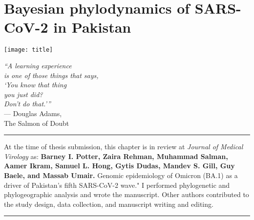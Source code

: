 \chapter{Bayesian phylodynamics of SARS-CoV-2 in Pakistan}\label{ch:chapter2}

\begin{minipage}[b]{0.6\textwidth}
    \texttt{[image: title]} %
  \end{minipage}
  \hfill
  \begin{minipage}[b]{0.32\textwidth}
    \footnotesize
    \begin{flushright}
      \textit{``A learning experience\\is one of those things that says,\\`You know that thing\\you just did?\\Don't do that.'\thinspace''} \\
      --- Douglas Adams, \\The Salmon of Doubt
    \end{flushright}
    \vspace{2cm}
\end{minipage}
  
\clearpage

\singlespacing

\hrule
\vspace*{12pt}
At the time of thesis submission, this chapter is in review at \textit{Journal of Medical Virology} as: \textbf{Barney I. Potter, Zaira Rehman, Muhammad Salman, Aamer Ikram, Samuel L. Hong, Gytis Dudas, Mandev S. Gill, Guy Baele, and Massab Umair.} Genomic epidemiology of Omicron (BA.1) as a driver of Pakistan's fifth SARS-CoV-2 wave."
I performed phylogenetic and phylogeographic analysis and wrote the manuscript.
Other authors contributed to the study design, data collection, and manuscript writing and editing.
\vspace*{12pt}
\hrule

\onehalfspacing

